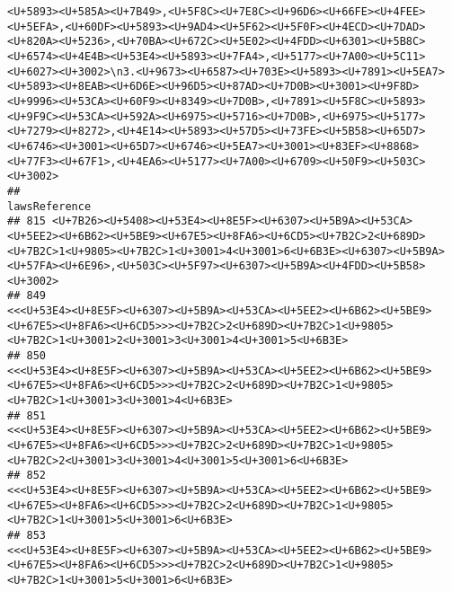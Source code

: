 \documentclass[
]{article}
\begin{document}
\begin{verbatim}
<U+5893><U+585A><U+7B49>,<U+5F8C><U+7E8C><U+96D6><U+66FE><U+4FEE><U+5EFA>,<U+60DF><U+5893><U+9AD4><U+5F62><U+5F0F><U+4ECD><U+7DAD><U+820A><U+5236>,<U+70BA><U+672C><U+5E02><U+4FDD><U+6301><U+5B8C><U+6574><U+4E4B><U+53E4><U+5893><U+7FA4>,<U+5177><U+7A00><U+5C11><U+6027><U+3002>\n3.<U+9673><U+6587><U+703E><U+5893><U+7891><U+5EA7><U+5893><U+8EAB><U+6D6E><U+96D5><U+87AD><U+7D0B><U+3001><U+9F8D><U+9996><U+53CA><U+60F9><U+8349><U+7D0B>,<U+7891><U+5F8C><U+5893><U+9F9C><U+53CA><U+592A><U+6975><U+5716><U+7D0B>,<U+6975><U+5177><U+7279><U+8272>,<U+4E14><U+5893><U+57D5><U+73FE><U+5B58><U+65D7><U+6746><U+3001><U+65D7><U+6746><U+5EA7><U+3001><U+83EF><U+8868><U+77F3><U+67F1>,<U+4EA6><U+5177><U+7A00><U+6709><U+50F9><U+503C><U+3002>
##                                                                                                                                                                                                                                                              lawsReference
## 815 <U+7B26><U+5408><U+53E4><U+8E5F><U+6307><U+5B9A><U+53CA><U+5EE2><U+6B62><U+5BE9><U+67E5><U+8FA6><U+6CD5><U+7B2C>2<U+689D><U+7B2C>1<U+9805><U+7B2C>1<U+3001>4<U+3001>6<U+6B3E><U+6307><U+5B9A><U+57FA><U+6E96>,<U+503C><U+5F97><U+6307><U+5B9A><U+4FDD><U+5B58><U+3002>
## 849                                                                                    <<<U+53E4><U+8E5F><U+6307><U+5B9A><U+53CA><U+5EE2><U+6B62><U+5BE9><U+67E5><U+8FA6><U+6CD5>>><U+7B2C>2<U+689D><U+7B2C>1<U+9805><U+7B2C>1<U+3001>2<U+3001>3<U+3001>4<U+3001>5<U+6B3E>
## 850                                                                                                      <<<U+53E4><U+8E5F><U+6307><U+5B9A><U+53CA><U+5EE2><U+6B62><U+5BE9><U+67E5><U+8FA6><U+6CD5>>><U+7B2C>2<U+689D><U+7B2C>1<U+9805><U+7B2C>1<U+3001>3<U+3001>4<U+6B3E>
## 851                                                                                    <<<U+53E4><U+8E5F><U+6307><U+5B9A><U+53CA><U+5EE2><U+6B62><U+5BE9><U+67E5><U+8FA6><U+6CD5>>><U+7B2C>2<U+689D><U+7B2C>1<U+9805><U+7B2C>2<U+3001>3<U+3001>4<U+3001>5<U+3001>6<U+6B3E>
## 852                                                                                                      <<<U+53E4><U+8E5F><U+6307><U+5B9A><U+53CA><U+5EE2><U+6B62><U+5BE9><U+67E5><U+8FA6><U+6CD5>>><U+7B2C>2<U+689D><U+7B2C>1<U+9805><U+7B2C>1<U+3001>5<U+3001>6<U+6B3E>
## 853                                                                                                      <<<U+53E4><U+8E5F><U+6307><U+5B9A><U+53CA><U+5EE2><U+6B62><U+5BE9><U+67E5><U+8FA6><U+6CD5>>><U+7B2C>2<U+689D><U+7B2C>1<U+9805><U+7B2C>1<U+3001>5<U+3001>6<U+6B3E>

\end{verbatim}
\end{document}
